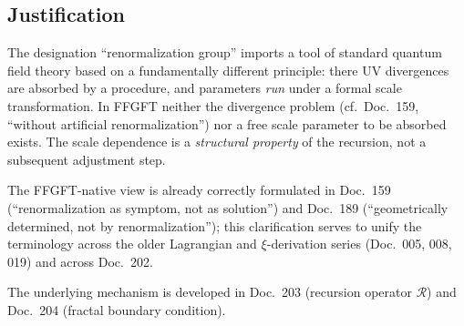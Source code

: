 \begin{center}
{\footnotesize
{}
}
\end{center}

\subsection*{Justification}

The designation \enquote{renormalization group} imports a tool
of standard quantum field theory based on a fundamentally different
principle: there UV divergences are absorbed by a procedure, and
parameters \emph{run} under a formal scale transformation.
In FFGFT neither the divergence problem (cf.\ Doc.~159,
\enquote{without artificial renormalization}) nor a free scale parameter to
be absorbed exists. The scale dependence is a \emph{structural
property} of the recursion, not a subsequent adjustment step.

The FFGFT-native view is already correctly formulated in Doc.~159
(\enquote{renormalization as symptom, not as solution}) and Doc.~189
(\enquote{geometrically determined, not by renormalization}); this
clarification serves to unify the terminology across the older
Lagrangian and $\xi$-derivation series (Doc.~005, 008, 019) and across
Doc.~202.

The underlying mechanism is developed in Doc.~203
(recursion operator $\mathcal{R}$) and Doc.~204
(fractal boundary condition).


